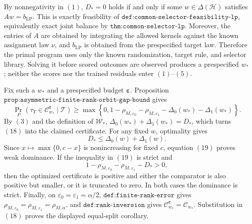 By nonnegativity in \((1)\), \(D_*=0\) holds if and only if some \(w\in\Delta(\mathcal H)\) satisfies \(Aw=b_{\mathrm{LP}}\). This is exactly feasibility of \(\texttt{def:common-selector-feasibility-lp}\), equivalently exact joint balance by \(\texttt{thm:common-selector-lp}\). Moreover, the entries of \(A\) are obtained by integrating the allowed kernels against the known assignment law \(\nu\), and \(b_{\mathrm{LP}}\) is obtained from the prespecified target law. Therefore the primal program uses only the known randomization, target rule, and selector library. Solving it before scored outcomes are observed produces a prespecified \(w_*\); neither the scores nor the trained residuals enter \((1)\)--\((5)\).

Fix such a \(w_*\) and a prespecified budget \(\boldsymbol\varepsilon\). Proposition \(\texttt{prop:asymmetric-finite-rank-orbit-gap-bound}\) gives
\[
\Pr_P\!\left(\tau_T\in\mathcal C^{\boldsymbol\varepsilon}_{w_*}\mid\mathcal T\right)\ge\max\!\left\{0,1-\rho_{M,\varepsilon_0}-\rho_{M,\varepsilon_1}-\Delta_0(w_*)-\Delta_1(w_*)\right\}.
\tag{18}
\]
By \((3)\) and the definition of \(\mathcal W_*\), \(\Delta_0(w_*)+\Delta_1(w_*)=D_*\), which turns \((18)\) into the claimed certificate. For any fixed \(w\), optimality gives
\[
D_*\le\Delta_0(w)+\Delta_1(w).
\tag{19}
\]
Since \(x\mapsto\max\{0,c-x\}\) is nonincreasing for fixed \(c\), equation \((19)\) proves weak dominance. If the inequality in \((19)\) is strict and
\[
1-\rho_{M,\varepsilon_0}-\rho_{M,\varepsilon_1}-D_*>0,
\]
then the optimized certificate is positive and either the comparator is also positive but smaller, or it is truncated to zero. In both cases the dominance is strict. Finally, on \(\varepsilon_0=\varepsilon_1=\alpha/2\), \(\texttt{def:finite-rank-error}\) gives \(\rho_{M,\varepsilon_0}=\rho_{M,\varepsilon_1}=\rho_{M,\alpha}\), and \(\texttt{def:rank-inversion}\) gives \(\mathcal C^{\boldsymbol\varepsilon}_{w_*}=\mathcal C_{w_*}\). Substitution in \((18)\) proves the displayed equal-split corollary.